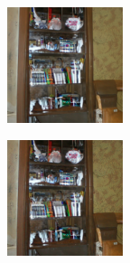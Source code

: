 \documentclass{article}
\begin{document}
\begin{figure}
\begin{subfigure}[b]{0.5\linewidth}
\begin{subfigure}[b]{0.242\linewidth}
        \end{subfigure}%
        \begin{subfigure}[b]{0.242\linewidth}
        \includegraphics[width=\linewidth]{figures/imagenet128/solver_samples/imagenet128_fm_ot_281_20.png}
        \end{subfigure}%
        \begin{subfigure}[b]{0.242\linewidth}
        \includegraphics[width=\linewidth]{figures/imagenet128/solver_samples/imagenet128_fm_ot_281_50.png}

\end{subfigure}
\end{subfigure}
\end{figure}
\end{document}
